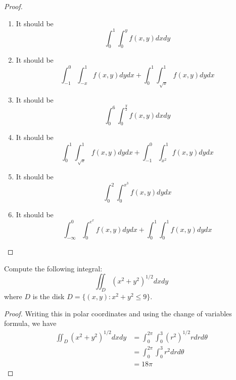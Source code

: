 \documentclass[openany]{book}
\begin{document}
\begin{proof}
    \begin{enumerate}
        \item It should be 
        \begin{equation*}
            \int_0^1\int_0^yf(x,y)dxdy
        \end{equation*}
        \item It should be 
        \begin{equation*}
            \int_{-1}^0\int_{-x}^{1}f(x,y)dydx+\int_{0}^1\int_{\sqrt{x}}^1f(x,y)dydx
        \end{equation*}
        \item It should be 
        \begin{equation*}
            \int_0^6\int_0^{\frac{y}{2}}f(x,y)dxdy
        \end{equation*}
        \item It should be \begin{equation*}
            \int_0^1\int_{\sqrt{x}}^1f(x,y)dydx+\int_{-1}^0\int_{x^2}^1f(x,y)dydx
        \end{equation*}
        \item It should be 
        \begin{equation*}
            \int_0^2\int_0^{x^3}f(x,y)dydx
        \end{equation*}
        \item It should be 
        \begin{equation*}
            \int_{-\infty}^0\int_0^{e^x}f(x,y)dydx+\int_0^1\int_0^1f(x,y)dydx
        \end{equation*}
    \end{enumerate}
\end{proof}



\begin{prob}
    Compute the following integral:
    \begin{equation*}
        \iint_D(x^2+y^2)^{1/2}dxdy
    \end{equation*}
    where $D$ is the disk $D=\{(x,y):x^2+y^2\leq 9\}$.
\end{prob}
\begin{proof}
    Writing this in polar coordinates and using the change of variables formula, we have 
    \begin{align*}
        \iint_D(x^2+y^2)^{1/2}dxdy&=\int_0^{2\pi}\int_{0}^3 (r^2)^{1/2}rdrd\theta\\
        &=\int_0^{2\pi}\int_0^3r^2drd\theta\\
        &=18\pi
    \end{align*}
\end{proof}
\end{document}
